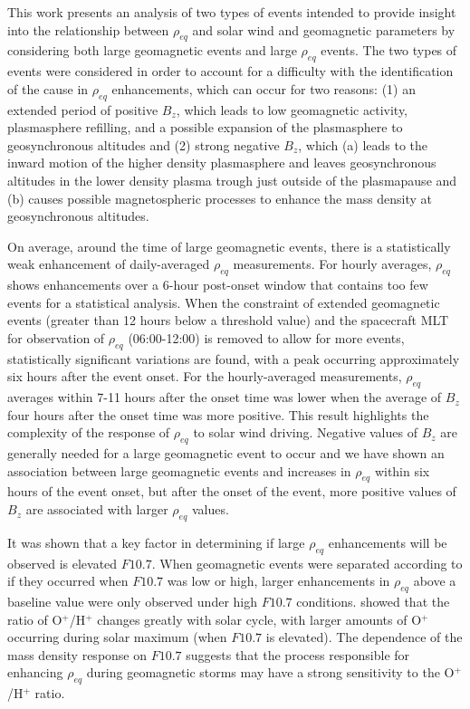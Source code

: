 \documentclass[draft,linenumbers]{agujournal}
\begin{document}
This work presents an analysis of two types of events intended to provide insight into the relationship between $\rho_{eq}$ and solar wind and geomagnetic parameters by considering both large geomagnetic events and large $\rho_{eq}$ events.  The two types of events were considered in order to account for a difficulty with the identification of the cause in $\rho_{eq}$ enhancements, which can occur for two reasons: (1) an extended period of positive $B_z$, which leads to low geomagnetic activity, plasmasphere refilling, and a possible expansion of the plasmasphere to geosynchronous altitudes and (2) strong negative $B_z$, which (a) leads to the inward motion of the higher density plasmasphere and leaves geosynchronous altitudes in the lower density plasma trough just outside of the plasmapause and (b) causes possible magnetospheric processes to enhance the mass density at geosynchronous altitudes.

On average, around the time of large geomagnetic events, there is a statistically weak enhancement of daily-averaged $\rho_{eq}$ measurements. For hourly averages, $\rho_{eq}$ shows enhancements over a 6-hour post-onset window that contains too few events for a statistical analysis.  When the constraint of extended geomagnetic events (greater than 12 hours below a threshold value) and the spacecraft MLT for observation of $\rho_{eq}$ (06:00-12:00) is removed to allow for more events, statistically significant variations are found, with a peak occurring approximately six hours after the event onset.  For the hourly-averaged measurements, $\rho_{eq}$ averages within 7-11 hours after the onset time was lower when the average of $B_{z}$ four hours after the onset time was more positive.  This result highlights the complexity of the response of $\rho_{eq}$ to solar wind driving.  Negative values of $B_{z}$ are generally needed for a large geomagnetic event to occur and we have shown an association between large geomagnetic events and increases in $\rho_{eq}$ within six hours of the event onset, but after the onset of the event, more positive values of $B_z$ are associated with larger $\rho_{eq}$ values.  


It was shown that a key factor in determining if large $\rho_{eq}$ enhancements will be observed is elevated $F10.7$.  When geomagnetic events were separated according to if they occurred when $F10.7$ was low or high, larger enhancements in $\rho_{eq}$ above a baseline value were only observed under high $F10.7$ conditions.  \cite{Denton2016} showed that the ratio of O$^+$/H$^+$ changes greatly with solar cycle, with larger amounts of O$^+$ occurring during solar maximum (when $F10.7$ is elevated).  The dependence of the mass density response on $F10.7$ suggests that the process responsible for enhancing $\rho_{eq}$ during geomagnetic storms may have a strong sensitivity to the O$^+$/H$^+$ ratio.
\end{document}
